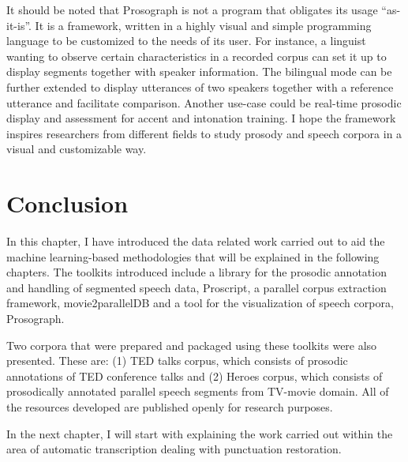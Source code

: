 It should be noted that Prosograph is not a program that obligates its usage ``as-it-is''. It is a framework, written in a highly visual and simple programming language to be customized to the needs of its user. For instance, a linguist wanting to observe certain characteristics in a recorded corpus can set it up to display segments together with speaker information. The bilingual mode can be further extended to display utterances of two speakers together with a reference utterance and facilitate comparison. Another use-case could be real-time prosodic display and assessment for accent and intonation training. I hope the framework inspires researchers from different fields to study prosody and speech corpora in a visual and customizable way. 

\section{Conclusion}

In this chapter, I have introduced the data related work carried out to aid the machine learning-based methodologies that will be explained in the following chapters. The toolkits introduced include a library for the prosodic annotation and handling of segmented speech data, Proscript, a parallel corpus extraction framework, movie2parallelDB and a tool for the visualization of speech corpora, Prosograph. 

Two corpora that were prepared and packaged using these toolkits were also presented. These are: (1) TED talks corpus, which consists of prosodic annotations of TED conference talks and (2) Heroes corpus, which consists of prosodically annotated parallel speech segments from TV-movie domain. All of the resources developed are published openly for research purposes. 

In the next chapter, I will start with explaining the work carried out within the area of automatic transcription dealing with punctuation restoration. 
